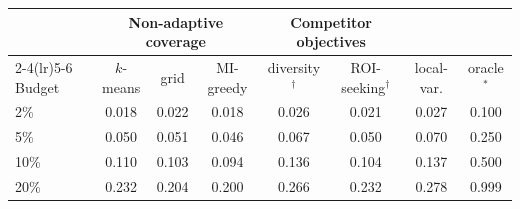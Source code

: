 \begin{tabular}{lccccccc}
\toprule
 & \multicolumn{3}{c}{Non-adaptive coverage} & \multicolumn{2}{c}{Competitor objectives} & & \\
\cmidrule(lr){2-4}\cmidrule(lr){5-6}
Budget & $k$-means & grid & MI-greedy & diversity$^\dagger$ & ROI-seeking$^\dagger$ & local-var. & oracle$^\ast$ \\
\midrule
2\% & 0.018 & 0.022 & 0.018 & 0.026 & 0.021 & 0.027 & 0.100 \\
5\% & 0.050 & 0.051 & 0.046 & 0.067 & 0.050 & 0.070 & 0.250 \\
10\% & 0.110 & 0.103 & 0.094 & 0.136 & 0.104 & 0.137 & 0.500 \\
20\% & 0.232 & 0.204 & 0.200 & 0.266 & 0.232 & 0.278 & 0.999 \\
\bottomrule
\end{tabular}